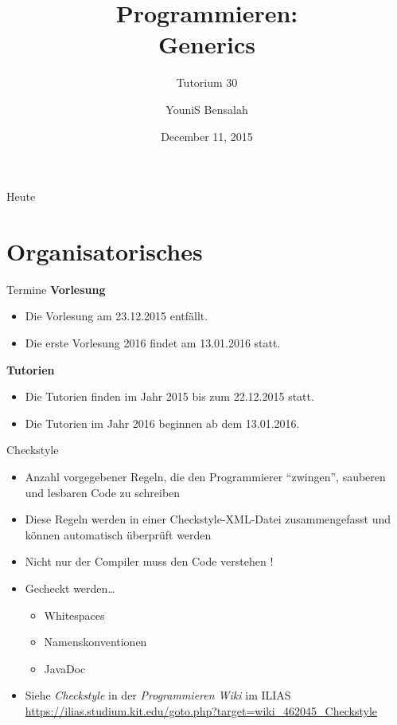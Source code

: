 \documentclass[18pt]{beamer}
\title[Generics]{Programmieren:\\ Generics}
\subtitle{Tutorium 30}
\author{YouniS Bensalah}
\date{December 11, 2015}
\institute{Chair for Software Design and Quality}
\newcommand{\quotes}[1]{``#1''}
\begin{document}

\begin{frame}
\titlepage
\end{frame}

\begin{frame}{Heute}
\tableofcontents
\end{frame}

\section{Organisatorisches}

\begin{frame}{Termine}
    \textbf{Vorlesung}
    \begin{itemize}
        \item Die Vorlesung am 23.12.2015 entfällt.
        \item Die erste Vorlesung 2016 findet am 13.01.2016 statt.
    \end{itemize}

    \textbf{Tutorien}
    \begin{itemize}
        \item Die Tutorien finden im Jahr 2015 bis zum 22.12.2015 statt.
        \item Die Tutorien im Jahr 2016 beginnen ab dem 13.01.2016.
    \end{itemize}
\end{frame}


\begin{frame}{Checkstyle}
    \begin{itemize}
        \item Anzahl vorgegebener Regeln, die den Programmierer \quotes{zwingen}, sauberen und lesbaren Code zu schreiben
        \item Diese Regeln werden in einer Checkstyle-XML-Datei zusammengefasst und können automatisch überprüft werden
        \item Nicht nur der Compiler muss den Code verstehen !
        \item Gecheckt werden\dots
        \begin{itemize}
            \item Whitespaces
            \item Namenskonventionen
            \item JavaDoc
        \end{itemize}
        \item Siehe \textit{Checkstyle} in der \textit{Programmieren Wiki} im ILIAS\\
        \url{https://ilias.studium.kit.edu/goto.php?target=wiki_462045_Checkstyle}
    \end{itemize}

\end{frame}
\end{document}
